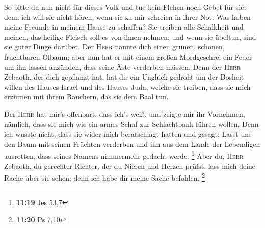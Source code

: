  So bitte du nun nicht für dieses Volk und tue kein
Flehen noch Gebet für sie; denn ich will sie nicht hören, wenn sie zu
mir schreien in ihrer Not.  Was haben meine Freunde in
meinem Hause zu schaffen? Sie treiben alle Schalkheit und meinen, das
heilige Fleisch soll es von ihnen nehmen; und wenn sie übeltun, sind sie
guter Dinge darüber.  Der \textsc{Herr} nannte dich einen
grünen, schönen, fruchtbaren Ölbaum; aber nun hat er mit einem großen
Mordgeschrei ein Feuer um ihn lassen anzünden, dass seine Äste verderben
müssen.  Denn der \textsc{Herr} Zebaoth, der dich
gepflanzt hat, hat dir ein Unglück gedroht um der Bosheit willen des
Hauses Israel und des Hauses Juda, welche sie treiben, dass sie mich
erzürnen mit ihrem Räuchern, das sie dem Baal tun.

 Der \textsc{Herr} hat mir's offenbart, dass ich's weiß,
und zeigte mir ihr Vornehmen,  nämlich, dass sie mich wie
ein armes Schaf zur Schlachtbank führen wollen. Denn ich wusste nicht,
dass sie wider mich beratschlagt hatten und gesagt: Lasst uns den Baum
mit seinen Früchten verderben und ihn aus dem Lande der Lebendigen
ausrotten, dass seines Namens nimmermehr gedacht werde. \footnote{\textbf{11:19}
  Jes 53,7}  Aber du, \textsc{Herr} Zebaoth, du gerechter
Richter, der du Nieren und Herzen prüfst, lass mich deine Rache über sie
sehen; denn ich habe dir meine Sache befohlen. \footnote{\textbf{11:20}
  Ps 7,10}

